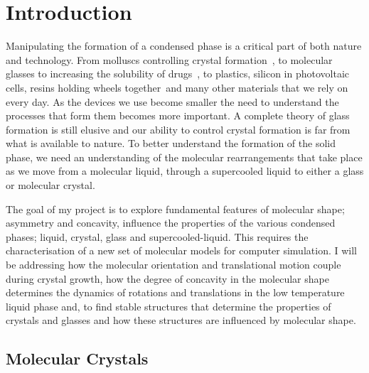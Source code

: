
\chapter{Introduction}


Manipulating the formation of a condensed phase is a critical part of both nature and technology. From molluscs controlling crystal formation~\cite{de-yoreo:03}, to molecular glasses to increasing the solubility of drugs~\cite{hancock:00}, to plastics\tocite, silicon in photovoltaic cells\tocite, resins holding wheels together~\tocite and many other materials that we rely on every day. As the devices we use become smaller the need to understand the processes that form them becomes more important. A complete theory of glass formation is still elusive and our ability to control crystal formation is far from what is available to nature. To better understand the formation of the solid phase, we need an understanding of the molecular rearrangements that take place as we move from a molecular liquid, through a supercooled liquid to either a glass or molecular crystal.

The goal of my project is to explore fundamental features of molecular shape; asymmetry and concavity, influence the properties of the various condensed phases; liquid, crystal, glass and supercooled-liquid. This requires the characterisation of a new set of molecular models for computer simulation. I will be addressing how the molecular orientation and translational motion couple during crystal growth, how the degree of concavity in the molecular shape determines the dynamics of rotations and translations in the low temperature liquid phase and, to find stable structures that determine the properties of crystals and glasses and how these structures are influenced by molecular shape.


\section{Molecular Crystals}
\label{sec:molecular crystals}

